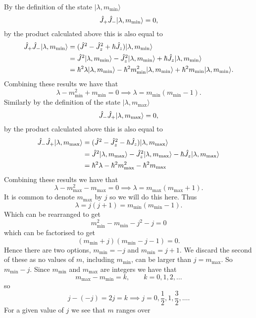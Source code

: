 \documentclass[a4paper]{article}
\renewcommand{\ket}[1]{\vert {#1} \rangle}
\theoremstyle{definition}
\begin{document}
    By the definition of the state \(\ket{\lambda, m_{\min}}\)
    \[\operator{J}_+\operator{J}_-\ket{\lambda, m_{\min}} = 0,\]
    by the product calculated above this is also equal to
    \begin{align*}
        \operator{J}_+\operator{J}_-\ket{\lambda, m_{\min}} &= (\operator{J}^2 - \operator{J}_z^2 + \hbar\operator{J}_z)\ket{\lambda, m_{\min}}\\
        &= \operator{J}^2\ket{\lambda, m_{\min}} - \operator{J}_z^2\ket{\lambda, m_{\min}} + \hbar\operator{J}_z\ket{\lambda, m_{\min}}\\
        &= \hbar^2\lambda\ket{\lambda, m_{\min}} - \hbar^2m_{\min}^2\ket{\lambda, m_{\min}} + \hbar^2m_{\min}\ket{\lambda, m_{\min}}.\\
    \end{align*}
    Combining these results we have that
    \[\lambda - m_{\min}^2 + m_{\min} = 0 \implies \lambda = m_{\min}(m_{\min} - 1).\]
    Similarly by the definition of the state \(\ket{\lambda, m_{\max}}\)
    \[\operator{J}_-\operator{J}_+\ket{\lambda, m_{\max}} = 0,\]
    by the product calculated above this is also equal to
    \begin{align*}
        \operator{J}_-\operator{J}_+\ket{\lambda, m_{\max}} &= (\operator{J}^2 - \operator{J}_z^2 - \hbar\operator{J}_z)\ket{\lambda, m_{\max}}\\
        &= \operator{J}^2\ket{\lambda, m_{\max}} - \operator{J}_z^2\ket{\lambda, m_{\max}} - \hbar\operator{J}_z\ket{\lambda, m_{\max}}\\
        &= \hbar^2\lambda - \hbar^2m_{\max}^2 - \hbar^2m_{\max}
    \end{align*}
    Combining these results we have that
    \[\lambda - m_{\max}^2 - m_{\max} = 0 \implies \lambda = m_{\max}(m_{\max} + 1).\]
    It is common to denote \(m_{\max}\) by \(j\) so we will do this here.
    Thus
    \[\lambda = j(j + 1) = m_{\min}(m_{\min} - 1).\]
    Which can be rearranged to get
    \[m_{\min}^2 - m_{\min} - j^2 - j = 0\]
    which can be factorised to get
    \[(m_{\min} + j)(m_{\min} - j - 1) = 0.\]
    Hence there are two options, \(m_{\min} = -j\) and \(m_{\min} = j + 1\).
    We discard the second of these as no values of \(m\), including \(m_{\min}\), can be larger than \(j = m_{\max}\).
    So \(m_{\min} -j\).
    Since \(m_{\min}\) and \(m_{\max}\) are integers we have that
    \[m_{\max} - m_{\min} = k,\qquad k = 0, 1, 2, \dotsc\]
    so
    \[j - (-j) = 2j = k \implies j = 0, \frac{1}{2}, 1, \frac{3}{2}, \dotsc.\]
    For a given value of \(j\) we see that \(m\) ranges over
\end{document}
